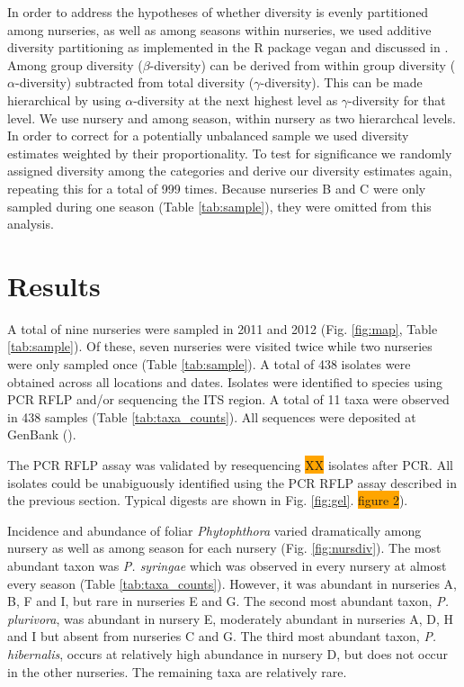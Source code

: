 \documentclass[12pt]{article}
\begin{document}
In order to address the hypotheses of whether diversity is evenly partitioned among nurseries, as well as among seasons within nurseries, we used additive diversity partitioning as implemented in the R package vegan \cite{vegan} and discussed in \cite{lande_1996, christ_etal_2003}.  Among group diversity ($\beta$-diversity) can be derived from within group diversity ($\alpha$-diversity) subtracted from total diversity ($\gamma$-diversity).  This can be made hierarchical by using $\alpha$-diversity at the next highest level as $\gamma$-diversity for that level.  We use nursery and among season, within nursery as two hierarchcal levels.  In order to correct for a potentially unbalanced sample we used diversity estimates weighted by their proportionality.  To test for significance we randomly assigned diversity among the categories and derive our diversity estimates again, repeating this for a total of 999 times.  Because nurseries B and C were only sampled during one season (Table \ref{tab:sample}), they were omitted from this analysis.

\section*{\sffamily\normalsize{Results}}

A total of nine nurseries were sampled in 2011 and 2012 (Fig. \ref{fig:map}, Table \ref{tab:sample}).  Of these, seven nurseries were visited twice while two nurseries were only sampled once (Table \ref{tab:sample}).  A total of 438 isolates were obtained across all locations and dates.  Isolates were identified to species using PCR RFLP and/or sequencing the ITS region. A total of 11 taxa were observed in 438 samples (Table \ref{tab:taxa_counts}).  All sequences were deposited at GenBank ().

The PCR RFLP assay was validated by resequencing \colorbox{orange}{XX} isolates after PCR. All isolates could be unabiguously identified using the PCR RFLP assay described in the previous section. Typical digests are shown in Fig. \ref{fig:gel}. \colorbox{orange}{figure 2}).

Incidence and abundance of foliar \emph{Phytophthora} varied dramatically among nursery as well as among season for each nursery (Fig. \ref{fig:nursdiv}).  The most abundant taxon was \emph{P. syringae} which was observed in every nursery at almost every season (Table \ref{tab:taxa_counts}).  However, it was abundant in nurseries A, B, F and I, but rare in nurseries E and G.  The second most abundant taxon, \emph{P. plurivora}, was abundant in nursery E, moderately abundant in nurseries A, D, H and I but absent from nurseries C and G.  The third most abundant taxon, \emph{P. hibernalis}, occurs at relatively high abundance in nursery D, but does not occur in the other nurseries.  The remaining taxa are relatively rare.
\end{document}
